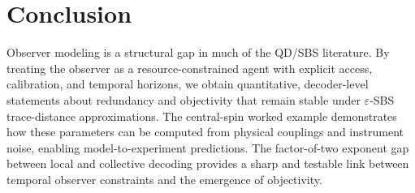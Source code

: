\documentclass[11pt]{article}
\newcommand{\1}{\mathbf{1}}
\theoremstyle{definition}
\theoremstyle{plain}
\begin{document}
\section{Conclusion}

Observer modeling is a structural gap in much of the QD/SBS literature.
By treating the observer as a resource-constrained agent with explicit access, calibration, and temporal horizons, we obtain quantitative, decoder-level statements about redundancy and objectivity that remain stable under $\varepsilon$-SBS trace-distance approximations.
The central-spin worked example demonstrates how these parameters can be computed from physical couplings and instrument noise, enabling model-to-experiment predictions.
The factor-of-two exponent gap between local and collective decoding provides a sharp and testable link between temporal observer constraints and the emergence of objectivity.



\end{document}
